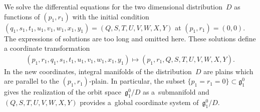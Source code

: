 \documentclass[10pt,a4paper]{amsart}
\numberwithin{equation}{section}
\begin{document}
We solve the dif\/ferential equations for the two dimensional distribution~$D$ as functions of $(p_1, r_1)$ with the initial condition $(q_1, s_1, t_1, u_1, v_1, w_1, x_1, y_1) =(Q,S,T,U,V,W,X,Y)$ at $(p_1, r_1) = (0,0)$. The expressions of solutions are too long and omitted here. These solutions def\/ine a coordinate transformation
\begin{gather*}
(p_1, r_1, q_1, s_1, t_1, u_1, v_1, w_1, x_1, y_1) \mapsto (p_1, r_1, Q,S,T,U,V,W,X,Y).
\end{gather*}
In the new coordinates, integral manifolds of the distribution~$D$ are plains which are parallel to the $(p_1, r_1)$-plain. In particular, the subset $\{ p_1 = r_1 = 0\} \subset \mathfrak{g}^0_1$ gives the realization of the orbit space~$\mathfrak{g}^0_1/D$ as a~submanifold and $(Q,S,T,U,V,W,X,Y)$ provides a~global coordinate system of~$\mathfrak{g}^0_1/D$.
\end{document}
